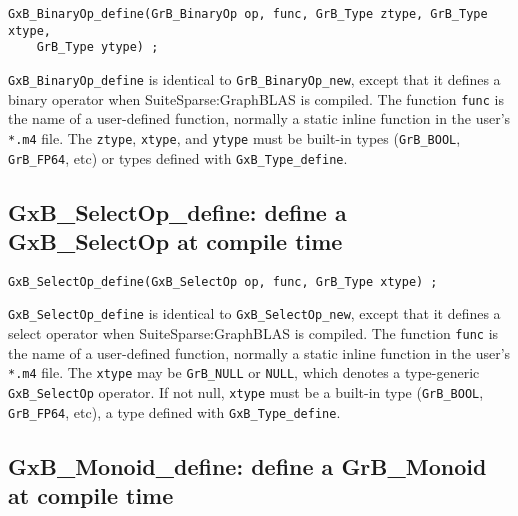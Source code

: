 \documentclass[12pt]{article}
\begin{document}
\begin{mdframed}[userdefinedwidth=6in]
{\footnotesize
\begin{verbatim}
GxB_BinaryOp_define(GrB_BinaryOp op, func, GrB_Type ztype, GrB_Type xtype,
    GrB_Type ytype) ;
\end{verbatim} } \end{mdframed}

    \verb'GxB_BinaryOp_define' is identical to \verb'GrB_BinaryOp_new', except
    that it defines a binary operator when SuiteSparse:GraphBLAS is compiled.
    The function \verb'func' is the name of a user-defined function, normally a
    static inline function in the user's \verb'*.m4' file.  The \verb'ztype',
    \verb'xtype', and \verb'ytype' must be built-in types (\verb'GrB_BOOL',
    \verb'GrB_FP64', etc) or types defined with \verb'GxB_Type_define'.

\newpage
\subsection{{\sf GxB\_SelectOp\_define:}
define a {\sf GxB\_SelectOp} at compile time}
\label{selectop_define}

\begin{mdframed}[userdefinedwidth=6in]
{\footnotesize
\begin{verbatim}
GxB_SelectOp_define(GxB_SelectOp op, func, GrB_Type xtype) ;
\end{verbatim} } \end{mdframed}

    \verb'GxB_SelectOp_define' is identical to \verb'GxB_SelectOp_new', except
    that it defines a select operator when SuiteSparse:GraphBLAS is compiled.
    The function \verb'func' is the name of a user-defined function, normally a
    static inline function in the user's \verb'*.m4' file.  The \verb'xtype'
    may be \verb'GrB_NULL' or \verb'NULL', which denotes a type-generic
    \verb'GxB_SelectOp' operator.  If not null, \verb'xtype' must be a built-in
    type (\verb'GrB_BOOL', \verb'GrB_FP64', etc), a type defined with
    \verb'GxB_Type_define'.

\subsection{{\sf GxB\_Monoid\_define:}
define a {\sf GrB\_Monoid} at compile time}
\label{monoid_define}
\end{document}

